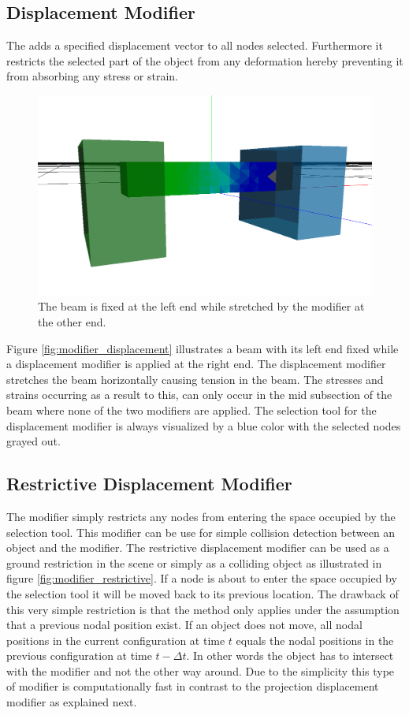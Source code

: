 \subsection{Displacement Modifier}
The  adds a specified displacement vector
to all nodes selected. Furthermore it restricts the selected part of the object
from any deformation hereby preventing it from absorbing any stress or
strain. 

\begin{figure}
\label{fig:modifier_displacement}
  \centering
  \includegraphics[width=12cm]{./images/helper_tools_modifiers_displacement.png}
\caption{The beam is fixed at the left end while stretched by the
  modifier at the other end.}
\end{figure}

Figure \vref{fig:modifier_displacement} illustrates a beam with its left
end fixed while a displacement modifier is applied at the right
end. The displacement modifier stretches the beam horizontally causing
tension in the beam. The
stresses and strains occurring as a result to this, can only occur in
the mid subsection of the beam where none of the two modifiers are
applied. The selection tool for the displacement modifier is always
visualized by a blue color with the selected nodes grayed out.


\subsection{Restrictive Displacement Modifier}
The  modifier simply restricts any nodes from
entering the space occupied by the selection tool. This modifier can be
use for simple collision detection between an object and the
modifier. The restrictive displacement modifier can be used as a
ground restriction in the scene or simply as a colliding object as
illustrated in figure \vref{fig:modifier_restrictive}. If a node is
about to enter the space 
occupied by the selection tool it will be moved back to its previous
location. The drawback of this very
simple restriction is that the method only applies under the
assumption that a previous nodal position exist. If an object does not
move, all nodal positions in the current configuration at time $t$
equals the nodal positions in the previous configuration at time
$t - \Delta t$. 
%
In other words the object has to intersect with the modifier and not
the other way around. Due to the simplicity this type of modifier is
computationally fast in contrast to the projection displacement modifier
as explained next.

